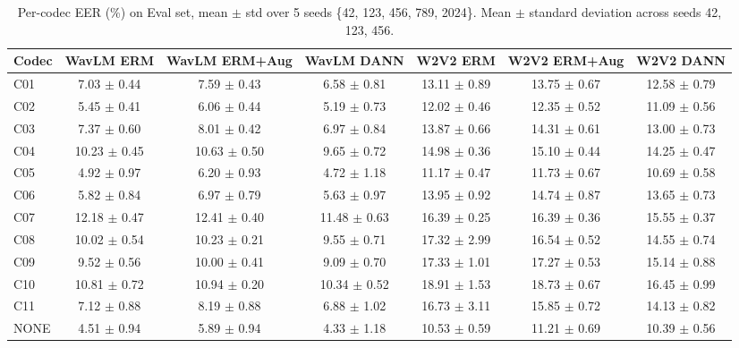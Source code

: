 \begin{table}[t]
\centering
\small
\begin{tabular}{lcccccc}
\toprule
Codec & WavLM ERM & WavLM ERM+Aug & WavLM DANN & W2V2 ERM & W2V2 ERM+Aug & W2V2 DANN \\
\midrule
C01 & 7.03 $\pm$ 0.44 & 7.59 $\pm$ 0.43 & 6.58 $\pm$ 0.81 & 13.11 $\pm$ 0.89 & 13.75 $\pm$ 0.67 & 12.58 $\pm$ 0.79 \\
C02 & 5.45 $\pm$ 0.41 & 6.06 $\pm$ 0.44 & 5.19 $\pm$ 0.73 & 12.02 $\pm$ 0.46 & 12.35 $\pm$ 0.52 & 11.09 $\pm$ 0.56 \\
C03 & 7.37 $\pm$ 0.60 & 8.01 $\pm$ 0.42 & 6.97 $\pm$ 0.84 & 13.87 $\pm$ 0.66 & 14.31 $\pm$ 0.61 & 13.00 $\pm$ 0.73 \\
C04 & 10.23 $\pm$ 0.45 & 10.63 $\pm$ 0.50 & 9.65 $\pm$ 0.72 & 14.98 $\pm$ 0.36 & 15.10 $\pm$ 0.44 & 14.25 $\pm$ 0.47 \\
C05 & 4.92 $\pm$ 0.97 & 6.20 $\pm$ 0.93 & 4.72 $\pm$ 1.18 & 11.17 $\pm$ 0.47 & 11.73 $\pm$ 0.67 & 10.69 $\pm$ 0.58 \\
C06 & 5.82 $\pm$ 0.84 & 6.97 $\pm$ 0.79 & 5.63 $\pm$ 0.97 & 13.95 $\pm$ 0.92 & 14.74 $\pm$ 0.87 & 13.65 $\pm$ 0.73 \\
C07 & 12.18 $\pm$ 0.47 & 12.41 $\pm$ 0.40 & 11.48 $\pm$ 0.63 & 16.39 $\pm$ 0.25 & 16.39 $\pm$ 0.36 & 15.55 $\pm$ 0.37 \\
C08 & 10.02 $\pm$ 0.54 & 10.23 $\pm$ 0.21 & 9.55 $\pm$ 0.71 & 17.32 $\pm$ 2.99 & 16.54 $\pm$ 0.52 & 14.55 $\pm$ 0.74 \\
C09 & 9.52 $\pm$ 0.56 & 10.00 $\pm$ 0.41 & 9.09 $\pm$ 0.70 & 17.33 $\pm$ 1.01 & 17.27 $\pm$ 0.53 & 15.14 $\pm$ 0.88 \\
C10 & 10.81 $\pm$ 0.72 & 10.94 $\pm$ 0.20 & 10.34 $\pm$ 0.52 & 18.91 $\pm$ 1.53 & 18.73 $\pm$ 0.67 & 16.45 $\pm$ 0.99 \\
C11 & 7.12 $\pm$ 0.88 & 8.19 $\pm$ 0.88 & 6.88 $\pm$ 1.02 & 16.73 $\pm$ 3.11 & 15.85 $\pm$ 0.72 & 14.13 $\pm$ 0.82 \\
NONE & 4.51 $\pm$ 0.94 & 5.89 $\pm$ 0.94 & 4.33 $\pm$ 1.18 & 10.53 $\pm$ 0.59 & 11.21 $\pm$ 0.69 & 10.39 $\pm$ 0.56 \\
\bottomrule
\end{tabular}
\caption{Per-codec EER (\%) on Eval set, mean $\pm$ std over 5 seeds \{42, 123, 456, 789, 2024\}. Mean $\pm$ standard deviation across seeds {42, 123, 456}.}
\label{tab:T2_per_codec_eer_seeds}
\end{table}
